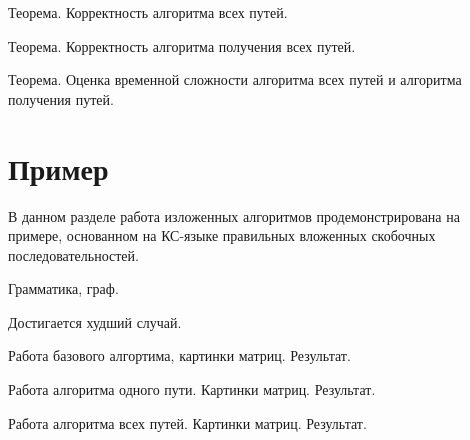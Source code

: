Теорема. Корректность алгоритма всех путей.

Теорема. Корректность алгоритма получения всех путей.

Теорема. Оценка временной сложности алгоритма всех путей и алгоритма получения путей.

\section{Пример}\label{sec:ch4/sect3}
В данном разделе работа изложенных алгоритмов продемонстрирована на примере, основанном на КС-языке правильных вложенных скобочных последовательностей.

Грамматика, граф.

Достигается худший случай.

Работа базового алгортима, картинки матриц. Результат.

Работа алгоритма одного пути. Картинки матриц. Результат.

Работа алгоритма всех путей. Картинки матриц. Результат.

\clearpage

